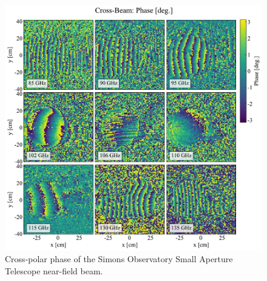 \begin{figure}
    \centering
    \includegraphics[width = \textwidth]{Figures/SAT_MF1_cr-phase.pdf}
    \caption{Cross-polar phase of the Simons Observatory Small Aperture Telescope near-field beam.}
    \label{fig:sat_mf_crphase}
\end{figure}
